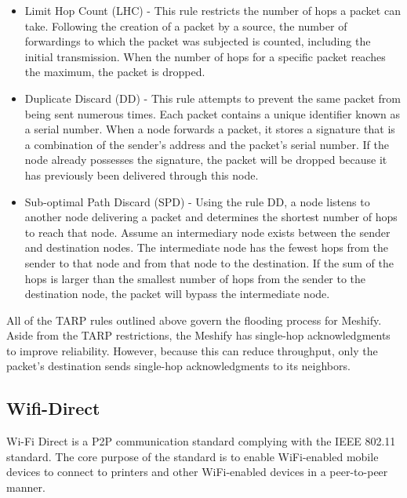 \documentclass[12pt, conference, onecolumn, a4paper]{IEEEtran}
\begin{document}
\begin{itemize}
    \item Limit Hop Count (LHC) - This rule restricts the number of hops a
          packet can take. Following the creation of a packet by a source, the
          number of
          forwardings to which the packet was subjected is counted, including
          the initial
          transmission. When the number of hops for a specific packet reaches
          the
          maximum, the packet is dropped.

    \item Duplicate Discard (DD) - This rule attempts to prevent the same
          packet from being sent numerous times. Each packet contains a unique
          identifier
          known as a serial number. When a node forwards a packet, it stores a
          signature
          that is a combination of the sender's address and the packet's serial
          number.
          If the node already possesses the signature, the packet will be
          dropped because
          it has previously been delivered through this node.

    \item Sub-optimal Path Discard (SPD) - Using the rule DD, a node listens to
          another node delivering a packet and determines the shortest number
          of hops to
          reach that node. Assume an intermediary node exists between the
          sender and
          destination nodes. The intermediate node has the fewest hops from the
          sender to
          that node and from that node to the destination. If the sum of the
          hops is
          larger than the smallest number of hops from the sender to the
          destination
          node, the packet will bypass the intermediate node.

\end{itemize}

All of the TARP rules outlined above govern the flooding process for Meshify.
Aside from the TARP restrictions, the Meshify has single-hop acknowledgments to
improve reliability. However, because this can reduce throughput, only the
packet's destination sends single-hop acknowledgments to its
neighbors\cite{gunasekara2022}.

\subsection{Wifi-Direct}

Wi-Fi Direct is a P2P communication standard complying with the IEEE 802.11
standard. The core purpose of the standard is to enable WiFi-enabled mobile
devices to connect to printers and other WiFi-enabled devices in a peer-to-peer
manner\cite{malar2023}.
\end{document}
